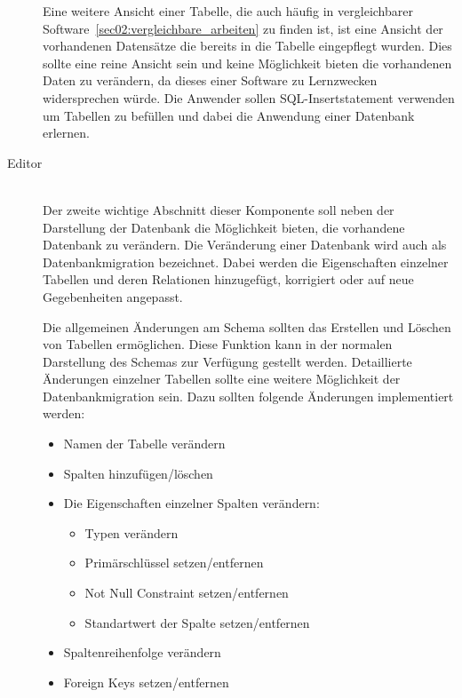 \begin{description}
Eine weitere Ansicht einer Tabelle, die auch häufig in vergleichbarer Software~\ref{sec02:vergleichbare_arbeiten} zu finden ist, ist eine Ansicht der vorhandenen Datensätze die bereits in die Tabelle eingepflegt wurden. Dies sollte eine reine Ansicht sein und keine Möglichkeit bieten die vorhandenen Daten zu verändern, da dieses einer Software zu Lernzwecken widersprechen würde. Die Anwender sollen SQL-Insertstatement verwenden um Tabellen zu befüllen und dabei die Anwendung einer Datenbank erlernen.

\item[Editor] \hfill\\
Der zweite wichtige Abschnitt dieser Komponente soll neben der Darstellung der Datenbank die Möglichkeit bieten, die vorhandene Datenbank zu verändern.
Die Veränderung einer Datenbank wird auch als Datenbankmigration bezeichnet. Dabei werden die Eigenschaften einzelner Tabellen und deren Relationen hinzugefügt, korrigiert oder auf neue Gegebenheiten angepasst.

Die allgemeinen Änderungen am Schema sollten das Erstellen und Löschen von Tabellen ermöglichen.
Diese Funktion kann in der normalen Darstellung des Schemas zur Verfügung gestellt werden. Detaillierte Änderungen einzelner Tabellen sollte eine weitere Möglichkeit der Datenbankmigration sein. Dazu sollten folgende Änderungen implementiert werden:
\begin{itemize}
\item Namen der Tabelle verändern
\item Spalten hinzufügen/löschen
\item Die Eigenschaften einzelner Spalten verändern:
    \begin{itemize}
    \item Typen verändern
    \item Primärschlüssel setzen/entfernen
    \item Not Null Constraint setzen/entfernen
    \item Standartwert der Spalte setzen/entfernen
    \end{itemize}
\item Spaltenreihenfolge verändern
\item Foreign Keys setzen/entfernen
\end{itemize}


\end{description}
